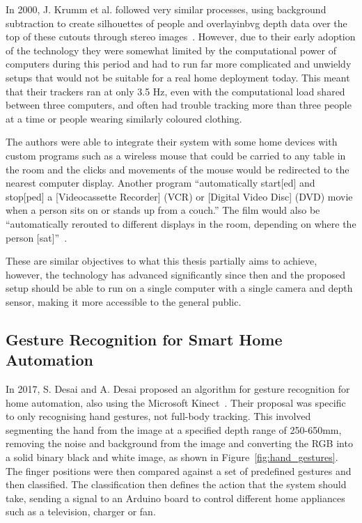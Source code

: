 In 2000, J. Krumm et al. followed very similar processes, using background subtraction to create silhouettes of people and overlayinbvg depth data over the top of these cutouts through stereo images~\cite{Krum00}.
However, due to their early adoption of the technology they were somewhat limited by the computational power of computers during this period and had to run far more complicated and unwieldy setups that would not be suitable for a real home deployment today.
This meant that their trackers ran at only 3.5 Hz, even with the computational load shared between three computers, and often had trouble tracking more than three people at a time or people wearing similarly coloured clothing.

The authors were able to integrate their system with some home devices with custom programs such as a wireless mouse that could be carried to any table in the room and the clicks and movements of the mouse would be redirected to the nearest computer display.
Another program ``automatically start[ed] and stop[ped] a [Videocassette Recorder] (VCR) or [Digital Video Disc] (DVD) movie when a person sits on or stands up from a couch.''
The film would also be ``automatically rerouted to different displays in the room, depending on where the person [sat]''~\cite{Krum00}.

These are similar objectives to what this thesis partially aims to achieve, however, the technology has advanced significantly since then and the proposed setup should be able to run on a single computer with a single camera and depth sensor, making it more accessible to the general public.

\subsection{Gesture Recognition for Smart Home Automation}
In 2017, S. Desai and A. Desai proposed an algorithm for gesture recognition for home automation, also using the Microsoft Kinect~\cite{Desa17}.
Their proposal was specific to only recognising hand gestures, not full-body tracking.
This involved segmenting the hand from the image at a specified depth range of 250-650mm, removing the noise and background from the image and converting the RGB into a solid binary black and white image, as shown in Figure~\ref{fig:hand_gestures}.
The finger positions were then compared against a set of predefined gestures and then classified.
The classification then defines the action that the system should take, sending a signal to an Arduino board to control different home appliances such as a television, charger or fan.

